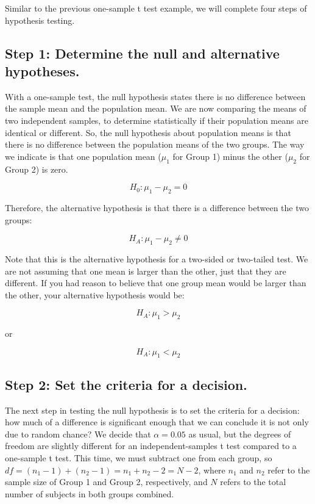 \documentclass[
  letterpaper,
  DIV=11,
  numbers=noendperiod]{scrreprt}
\begin{document}
Similar to the previous one-sample t test example, we will complete four
steps of hypothesis testing.

\subsection*{Step 1: Determine the null and alternative
hypotheses.}\label{step-1-determine-the-null-and-alternative-hypotheses.-1}

With a one-sample test, the null hypothesis states there is no
difference between the sample mean and the population mean. We are now
comparing the means of two independent samples, to determine
statistically if their population means are identical or different. So,
the null hypothesis about population means is that there is no
difference between the population means of the two groups. The way we
indicate is that one population mean (\(\mu_1\) for Group 1) minus the
other (\(\mu_2\) for Group 2) is zero.

\[
H_0: \mu_1− \mu_2=0
\]

Therefore, the alternative hypothesis is that there is a difference
between the two groups:

\[
H_A: \mu_1− \mu_2\ne 0
\]

Note that this is the alternative hypothesis for a two-sided or
two-tailed test. We are not assuming that one mean is larger than the
other, just that they are different. If you had reason to believe that
one group mean would be larger than the other, your alternative
hypothesis would be:

\[
H_A: \mu_1 > \mu_2
\]

or

\[
H_A: \mu_1 < \mu_2
\]

\subsection*{Step 2: Set the criteria for a
decision.}\label{step-2-set-the-criteria-for-a-decision.-2}

The next step in testing the null hypothesis is to set the criteria for
a decision: how much of a difference is significant enough that we can
conclude it is not only due to random chance? We decide that
\(\alpha = 0.05\) as usual, but the degrees of freedom are slightly
different for an independent-samples t test compared to a one-sample t
test. This time, we must subtract one from each group, so
\(df = (n_1 − 1)+(n_2 − 1) = n_1 + n_2−2 = N - 2\), where \(n_1\) and
\(n_2\) refer to the sample size of Group 1 and Group 2, respectively,
and \(N\) refers to the total number of subjects in both groups
combined.
\end{document}
